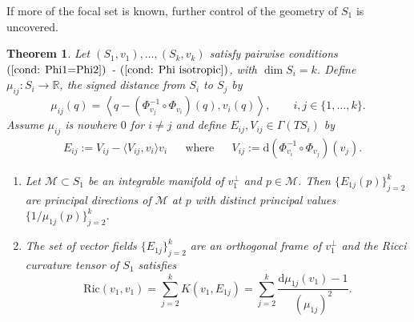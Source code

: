 \documentclass[12pt]{amsart}
\theoremstyle{plain}
\newtheorem{Thm}{Theorem}
\theoremstyle{definition}
\newcommand{\td}{\mathrm{d}}
\numberwithin{equation}{section}
\begin{document}
If more of the focal set is known, further control of the geometry of $S_1$ is uncovered.
\begin{Thm} \label{Thm: curvature control from multiple focal set componants}
   Let $(S_1,v_1),\ldots,(S_k,v_k)$ satisfy pairwise conditions $(\ref{cond: Phi1=Phi2})$ - $(\ref{cond: Phi isotropic})$, with $\dim S_i=k$. Define $\mu_{ij}:S_i\to \mathbb{R}$, the signed distance from $S_i$ to $S_j$ by
\begin{equation}\label{eq: all the distance functions}
\mu_{ij}(q)=\left\langle q- (\Phi_{v_j}^{-1} \circ \Phi_{v_i})(q),v_i(q)\right\rangle, \qquad i,j\in\{1,\ldots,k\}.
\end{equation}
Assume $\mu_{ij}$ is nowhere $0$ for $i\neq j$ and define $E_{ij},V_{ij}\in\Gamma(TS_i)$ by
\begin{align*}
        &E_{ij}:=V_{ij}-\langle V_{ij},v_i\rangle v_i &&\text{where} &&V_{ij}:=\td(\Phi^{-1}_{v_i}\circ\Phi_{v_j})(v_j).
    \end{align*}
\begin{enumerate}[label=\alph*)]
    \item Let $\mathcal{M}\subset S_1$ be an integrable manifold of $v_1^\perp$ and $p\in \mathcal{M}$. Then $\{E_{1j}(p)\}^k_{j=2}$ are principal directions of $\mathcal{M}$ at $p$ with distinct principal values $\{1/\mu_{1j}(p)\}_{j=2}^{k}$.
    \item The set of vector fields $\{E_{1j}\}^k_{j=2}$ are an orthogonal frame of $v_1^\perp$ and the Ricci curvature tensor of $S_1$ satisfies
    \[
    \mbox{Ric}(v_1,v_1)=\sum_{j=2}^{k}K(v_1,E_{1j})=\sum_{j=2}^{k}\frac{\td \mu_{1j}(v_1)-1}{(\mu_{1j})^2}.
    \] 
\end{enumerate}
\end{Thm}
\end{document}
